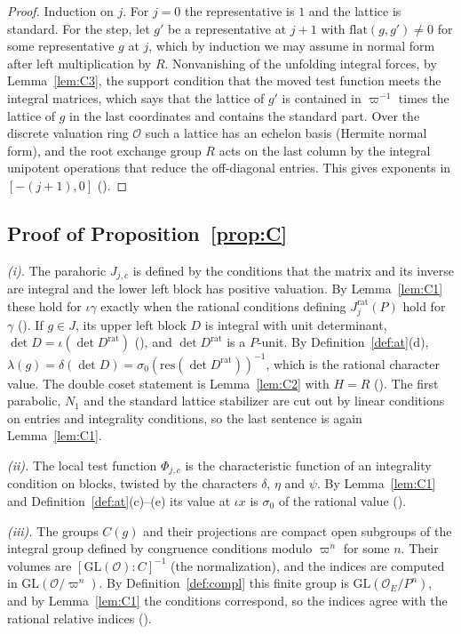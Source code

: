 \documentclass[11pt]{article}
\newcommand{\OEr}{\mathcal O_E}
\newcommand{\Ok}{\mathcal O}
\newcommand{\GL}{\mathrm{GL}}
\theoremstyle{definition}
\theoremstyle{remark}
\begin{document}
\begin{proof}
Induction on $j$. For $j=0$ the representative is $1$ and the lattice is standard. For the step, let $g'$ be a representative at $j+1$ with $\mathrm{flat}(g,g')\ne0$ for some representative $g$ at $j$, which by induction we may assume in normal form after left multiplication by $R$. Nonvanishing of the unfolding integral forces, by Lemma~\ref{lem:C3}, the support condition that the moved test function meets the integral matrices, which says that the lattice of $g'$ is contained in $\varpi^{-1}$ times the lattice of $g$ in the last coordinates and contains the standard part. Over the discrete valuation ring $\Ok$ such a lattice has an echelon basis (Hermite normal form), and the root exchange group $R$ acts on the last column by the integral unipotent operations that reduce the off-diagonal entries. This gives exponents in $[-(j+1),0]$ ().
\end{proof}

\subsection{Proof of Proposition~\ref{prop:C}}

\emph{(i).} The parahoric $J_{j,c}$ is defined by the conditions that the matrix and its inverse are integral and the lower left block has positive valuation. By Lemma~\ref{lem:C1} these hold for $\iota\gamma$ exactly when the rational conditions defining $J^{\mathrm{rat}}_j(P)$ hold for $\gamma$ (). If $g\in J$, its upper left block $D$ is integral with unit determinant, $\det D=\iota(\det D^{\mathrm{rat}})$ (), and $\det D^{\mathrm{rat}}$ is a $P$-unit. By Definition~\ref{def:at}(d), $\lambda(g)=\delta(\det D)=\sigma_0(\mathrm{res}(\det D^{\mathrm{rat}}))^{-1}$, which is the rational character value. The double coset statement is Lemma~\ref{lem:C2} with $H=R$ (). The first parabolic, $N_1$ and the standard lattice stabilizer are cut out by linear conditions on entries and integrality conditions, so the last sentence is again Lemma~\ref{lem:C1}.

\emph{(ii).} The local test function $\Phi_{j,c}$ is the characteristic function of an integrality condition on blocks, twisted by the characters $\delta$, $\eta$ and $\psi$. By Lemma~\ref{lem:C1} and Definition~\ref{def:at}(c)--(e) its value at $\iota x$ is $\sigma_0$ of the rational value ().

\emph{(iii).} The groups $C(g)$ and their projections are compact open subgroups of the integral group defined by congruence conditions modulo $\varpi^{n}$ for some $n$. Their volumes are $[\GL(\Ok):C]^{-1}$ (the normalization), and the indices are computed in $\GL(\Ok/\varpi^n)$. By Definition~\ref{def:compl} this finite group is $\GL(\OEr/P^n)$, and by Lemma~\ref{lem:C1} the conditions correspond, so the indices agree with the rational relative indices ().
\end{document}
